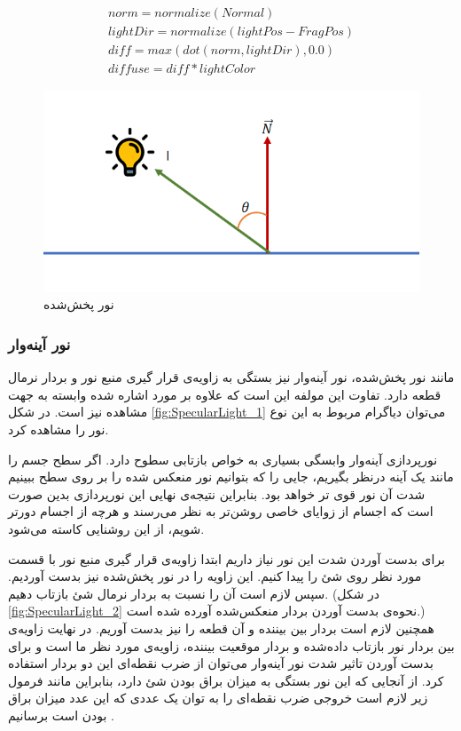 \begin{gather*}
	norm = normalize(Normal) \\
	lightDir = normalize(lightPos - FragPos) \\
	diff = max(dot(norm, lightDir), 0.0) \\
	diffuse = diff * lightColor
\end{gather*}



\begin{figure}[ht]
	\centerline{\includegraphics[width=\textwidth,height=\textheight,keepaspectratio]{Figures/Ch5/DiffuseLight.png}}

	\caption{نور پخش‌شده}
	\label{fig:DiffuseLight}
\end{figure}
  

\subsubsection{نور آینه‌وار}

مانند نور پخش‌شده، نور آینه‌وار نیز بستگی به زاویه‌ی 
قرار گیری منبع نور و بردار نرمال قطعه دارد. تفاوت این 
مولفه این است که علاوه بر مورد اشاره شده وابسته به جهت مشاهده نیز است.
در شکل 
\ref{fig:SpecularLight_1}
می‌توان دیاگرام مربوط به این نوع نور را مشاهده کرد.

نورپردازی آینه‌وار وابسگی بسیاری به خواص بازتابی سطوح دارد.
اگر سطح جسم را مانند یک آینه درنظر بگیریم، جایی را که 
بتوانیم نور منعکس شده را بر روی سطح ببینیم 
شدت آن نور قوی تر خواهد بود.
بنابراین نتیجه‌ی نهایی این نورپردازی بدین صورت است که اجسام از زوایای خاصی 
روشن‌تر به نظر می‌رسند و هرچه از اجسام دورتر شویم، از این روشنایی کاسته می‌شود.

برای بدست آوردن شدت این نور نیاز داریم ابتدا زاویه‌ی قرار گیری منبع نور با قسمت مورد 
نظر روی شئ را پیدا کنیم. این زاویه را در نور پخش‌شده نیز بدست آوردیم. 
سپس لازم است آن را نسبت به بردار نرمال شئ بازتاب دهیم.
(در شکل 
\ref{fig:SpecularLight_2}
نحوه‌ی بدست آوردن بردار منعکس‌شده  آورده شده است.)
همچنین لازم است بردار بین بیننده و آن قطعه را نیز بدست آوریم.
در نهایت زاویه‌ی بین بردار نور بازتاب داده‌شده و بردار موقعیت بیننده،
زاویه‌ی مورد نظر ما است و برای بدست آوردن 
تاثیر شدت نور آینه‌وار می‌توان از ضرب نقطه‌ای این دو بردار استفاده کرد.
از آنجایی که این نور بستگی به میزان براق بودن شئ دارد، 
بنابراین مانند فرمول زیر لازم است خروجی ضرب نقطه‌ای را به توان 
یک عددی که این عدد میزان براق بودن است برسانیم \cite{ogldevSpecularLighting} \cite{MITShading}.


